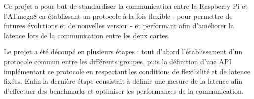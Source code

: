 Ce projet a pour but de standardiser la communication entre la Raspberry Pi et
l'ATmega8 en établissant un protocole à la fois flexible - pour permettre de
futures évolutions et de nouvelles version - et performant afin d'améliorer la
latence lors de la communication entre les deux cartes.

Le projet a été découpé en plusieurs étapes : tout d'abord l'établissement
d'un protocole commun entre les différents groupes, puis la définition d'une
API implémentant ce protocole en respectant les conditions de flexibilité et
de latence fixées. Enfin la dernière étape consistait à définir une mesure de
la latence afin d'effectuer des benchmarks et optimiser les performances de la
communication.
